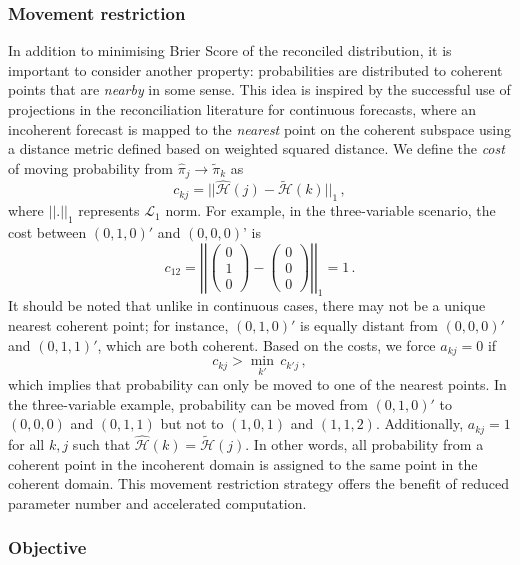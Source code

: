 \documentclass[a4paper,review,12pt,authoryear]{elsarticle}
\theoremstyle{definition}
\begin{document}
    \subsubsection*{\textbf{Movement restriction}}
    In addition to minimising Brier Score of the reconciled distribution, it is important to consider another property: probabilities are distributed to coherent points that are \emph{nearby} in some sense.
    This idea is inspired by the successful use of projections in the reconciliation literature for continuous forecasts, where an incoherent forecast is mapped to the \emph{nearest} point on the coherent subspace using a distance metric defined based on weighted squared distance.
    We define the \emph{cost} of moving probability from $\hat{\pi}_j\rightarrow\tilde{\pi}_k$ as
    \[
    c_{kj}=||\hat{\mathcal{H}}(j)-\tilde{\mathcal{H}}(k)||_1\,,
    \]
    where $||.||_1$ represents $\mathcal{L}_1$ norm. For example, in the three-variable scenario, the cost between $(0, 1, 0)'$ and $(0, 0, 0)$' is
    \[
    c_{12}=\left|\left|\begin{pmatrix}0\\1\\0\end{pmatrix}-\begin{pmatrix}0\\0\\0\end{pmatrix}\right|\right|_1=1\,.
    \]
    It should be noted that unlike in continuous cases, there may not be a unique nearest coherent point; for instance, $(0,1,0)'$ is equally distant from $(0,0,0)'$ and $(0,1,1)'$, which are both coherent.
    Based on the costs, we force $a_{kj}=0$ if
    \[
      c_{kj}>\underset{k'}{\min}\,c_{k'j}\,,
    \]
    which implies that probability can only be moved to one of the nearest points. In the three-variable example, probability can be moved from $(0,1,0)'$ to $(0,0,0)$ and $(0,1,1)$ but not to $(1,0,1)$ and $(1,1,2)$.
    Additionally, $a_{kj}=1$ for all $k,j$ such that $\hat{\mathcal{H}}(k)=\tilde{\mathcal{H}}(j)$.
    In other words, all probability from a coherent point in the incoherent domain is assigned to the same point in the coherent domain.
    This movement restriction strategy offers the benefit of reduced parameter number and accelerated computation.


    \subsubsection*{\textbf{Objective}}
\end{document}
